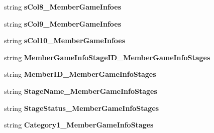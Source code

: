 \begin{DoxyCompactItemize}
\item 
string {\bfseries s\+Col8\+\_\+\+Member\+Game\+Infoes}\hypertarget{a00111_a1c55d6bd0876d226a61d833dd5180fa9}{}\label{a00111_a1c55d6bd0876d226a61d833dd5180fa9}

\item 
string {\bfseries s\+Col9\+\_\+\+Member\+Game\+Infoes}\hypertarget{a00111_a913132056ba8045bf28adef03cc38a93}{}\label{a00111_a913132056ba8045bf28adef03cc38a93}

\item 
string {\bfseries s\+Col10\+\_\+\+Member\+Game\+Infoes}\hypertarget{a00111_a5b4b859eed446f089255f72186048bb9}{}\label{a00111_a5b4b859eed446f089255f72186048bb9}

\item 
string {\bfseries Member\+Game\+Info\+Stage\+I\+D\+\_\+\+Member\+Game\+Info\+Stages}\hypertarget{a00111_aa006998a67d2fa3ecfd01d2e582e4f82}{}\label{a00111_aa006998a67d2fa3ecfd01d2e582e4f82}

\item 
string {\bfseries Member\+I\+D\+\_\+\+Member\+Game\+Info\+Stages}\hypertarget{a00111_aba18d4b08d45bb61df2e36b48ab4c110}{}\label{a00111_aba18d4b08d45bb61df2e36b48ab4c110}

\item 
string {\bfseries Stage\+Name\+\_\+\+Member\+Game\+Info\+Stages}\hypertarget{a00111_a251fb9c3fd8253ded9a2a98effccc1db}{}\label{a00111_a251fb9c3fd8253ded9a2a98effccc1db}

\item 
string {\bfseries Stage\+Status\+\_\+\+Member\+Game\+Info\+Stages}\hypertarget{a00111_aadbc7c863311aabee9b1070ab69835b4}{}\label{a00111_aadbc7c863311aabee9b1070ab69835b4}

\item 
string {\bfseries Category1\+\_\+\+Member\+Game\+Info\+Stages}\hypertarget{a00111_ade4c37d06117cc6f67f01ec0c380cd66}{}\label{a00111_ade4c37d06117cc6f67f01ec0c380cd66}


\end{DoxyCompactItemize}
